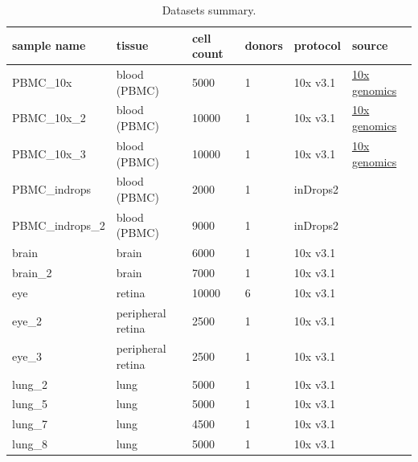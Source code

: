 \begin{table}[htbp]
  \centering
  \begin{tabular}{l|lllll}
    \toprule
    sample name & tissue & cell count & donors & protocol & source \\
    \midrule
    PBMC\_10x & blood (PBMC) & 5000 & 1 & 10x v3.1 & \href{https://www.10xgenomics.com/datasets/5k-human-pbmcs-3-v3-1-chromium-controller-3-1-standard}{10x genomics} \\
    PBMC\_10x\_2 & blood (PBMC) & 10000 & 1 & 10x v3.1 & \href{https://www.10xgenomics.com/datasets/10k-human-pbmcs-3-ht-v3-1-chromium-x-3-1-high}{10x genomics} \\
    PBMC\_10x\_3 & blood (PBMC) & 10000 & 1 & 10x v3.1 & \href{https://www.10xgenomics.com/datasets/10k-human-pbmcs-3-v3-1-chromium-controller-3-1-high}{10x genomics} \\
    PBMC\_indrops & blood (PBMC) & 2000 & 1 & inDrops2 & \cite{Juzenas2025} \\
    PBMC\_indrops\_2 & blood (PBMC) & 9000 & 1 & inDrops2 & \cite{Juzenas2025} \\
    brain & brain & 6000 & 1 & 10x v3.1 & \cite{Siletti2023} \\
    brain\_2 & brain & 7000 & 1 & 10x v3.1 & \cite{Siletti2023} \\
    eye & retina & 10000 & 6 & 10x v3.1 & \cite{Menon2019} \\
    eye\_2 & peripheral retina & 2500 & 1 & 10x v3.1 & \cite{Voigt2019} \\
    eye\_3 & peripheral retina & 2500 & 1 & 10x v3.1 & \cite{Voigt2019} \\
    lung\_2 & lung & 5000 & 1 & 10x v3.1 & \cite{Mould2021} \\
    lung\_5 & lung & 5000 & 1 & 10x v3.1 & \cite{Mould2021} \\
    lung\_7 & lung & 4500 & 1 & 10x v3.1 & \cite{Mould2021} \\
    lung\_8 & lung & 5000 & 1 & 10x v3.1 & \cite{Mould2021} \\
    \bottomrule
  \end{tabular}
  \caption{Datasets summary.}
  \label{tab:datasets}
\end{table}
